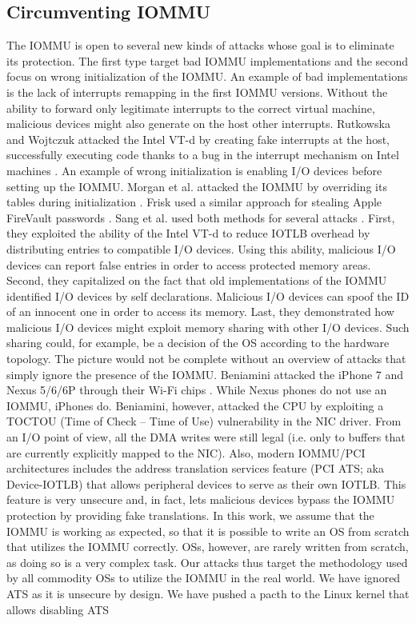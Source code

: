 \subsection{Circumventing IOMMU}
The IOMMU is open to several new kinds of attacks whose goal is to eliminate its protection. The first type target bad IOMMU implementations and the second focus on wrong initialization of the IOMMU. An example of bad implementations is the lack of interrupts remapping in the first IOMMU versions. Without the ability to forward only legitimate interrupts to the correct virtual machine, malicious devices might also generate on the host other interrupts. Rutkowska and Wojtczuk attacked the Intel VT-d by creating fake interrupts at the host, successfully executing code thanks to a bug in the interrupt mechanism on Intel machines \cite{WR11}. An example of wrong initialization is enabling I/O devices before setting up the IOMMU. Morgan et al. attacked the IOMMU by overriding its tables during initialization \cite{MANK16}. Frisk used a similar approach for stealing Apple FireVault passwords \cite{Cim16}. Sang et al. used both methods for several attacks \cite{SLND10}. First, they exploited the ability of the Intel VT-d to reduce IOTLB overhead by distributing entries to compatible I/O devices. Using this ability, malicious I/O devices can report false entries in order to access protected memory areas. Second, they capitalized on the fact that old implementations of the IOMMU identified I/O devices by self declarations. Malicious I/O devices can spoof the ID of an innocent one in order to access its memory. Last, they demonstrated how malicious I/O devices might exploit memory sharing with other I/O devices. Such sharing could, for example, be a decision of the OS according to the hardware topology. The picture would not be complete without an overview of attacks that simply ignore the presence of the IOMMU. Beniamini attacked the iPhone 7 and Nexus 5/6/6P through their Wi-Fi chips \cite{Ben17a, Ben17b}. While Nexus phones do not use an IOMMU, iPhones do. Beniamini, however, attacked the CPU by exploiting a TOCTOU (Time of Check – Time of Use) vulnerability in the NIC driver. From an I/O point of view, all the DMA writes were still legal (i.e. only to buffers that are currently explicitly mapped to the NIC). Also, modern IOMMU/PCI architectures includes the address translation services feature (PCI ATS; aka Device-IOTLB) that allows peripheral devices to serve as their own IOTLB. This feature is very unsecure and, in fact, lets malicious devices bypass the IOMMU protection by providing fake translations. In this work, we assume that the IOMMU is working as expected, so that it is possible to write an OS from scratch that utilizes the IOMMU correctly. OSs, however, are rarely written from scratch, as doing so is a very complex task. Our attacks thus target the methodology used by all commodity OSs to utilize the IOMMU in the real world. We have ignored ATS as it is unsecure by design. We have pushed a pacth to the Linux kernel that allows disabling ATS 
\begin{comment}
\footnote{https://lore.kernel.org/lkml/20180510230948.GF190385@bhelgaas-glaptop.roam.corp.google.com/}.
\end{comment}

